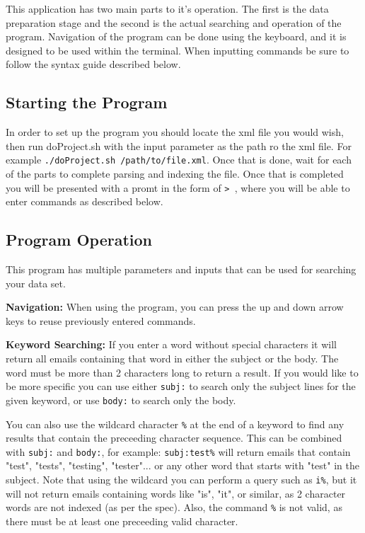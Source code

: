 This application has two main parts to it's operation.  The first is the data preparation stage
and the second is the actual searching and operation of the program.  Navigation of the program
can be done using the keyboard, and it is designed to be used within the terminal.  When 
inputting commands be sure to follow the syntax guide described below. 

\subsection{Starting the Program}
In order to set up the program you should locate the xml file you would wish, then run doProject.sh
with the input parameter as the path ro the xml file.  For example 
\verb|./doProject.sh /path/to/file.xml|.  Once that is done, wait for each of the parts to complete
parsing and indexing the file.  Once that is completed you will be presented with a promt in the 
form of \verb|> |, where you will be able to enter commands as described below.  

\subsection{Program Operation}
This program has multiple parameters and inputs that can be used for searching your data set.

\textbf{Navigation: }
When using the program, you can press the up and down arrow keys to reuse previously entered 
commands. 

\textbf{Keyword Searching: }
If you enter a word without special characters it will return all emails containing that word
in either the subject or the body.  The word must be more than 2 characters long to return a 
result.  If you would like to be more specific you can use either \verb|subj:| to search only
the subject lines for the given keyword, or use \verb|body:| to search only the body.  

You can also use the wildcard character \verb|%| at the end of a keyword to find any results that 
contain the preceeding character sequence.  This can be combined with \verb|subj:| and 
\verb|body:|, for example: \verb|subj:test%| will return emails that contain "test", "tests", 
"testing", "tester"... or any other word that starts with "test" in the subject.  Note that 
using the wildcard you can perform a query such as \verb|i%|, but it will not return emails 
containing words like "is", "it", or similar, as 2 character words are not indexed (as per the 
spec).  Also, the command \verb|%| is not valid, as there must be at least one preceeding valid 
character.  

